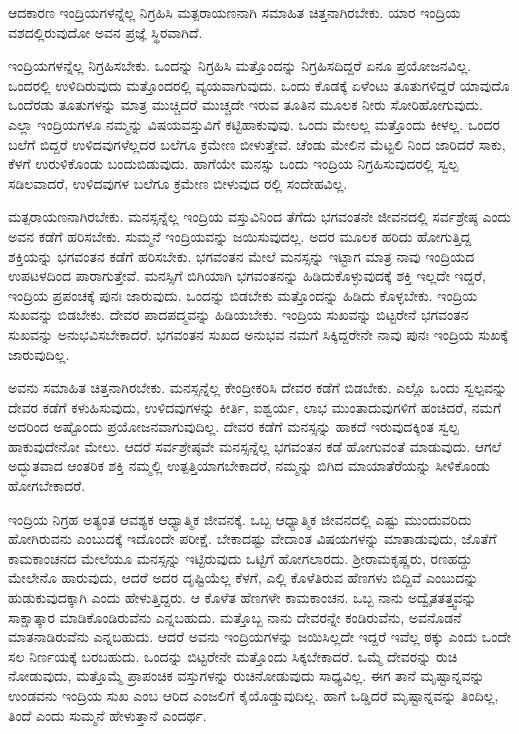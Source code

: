 {\small ಆದಕಾರಣ ಇಂದ್ರಿಯಗಳನ್ನೆಲ್ಲ ನಿಗ್ರಹಿಸಿ ಮತ್ಪರಾಯಣನಾಗಿ ಸಮಾಹಿತ ಚಿತ್ತನಾಗಿರಬೇಕು. ಯಾರ ಇಂದ್ರಿಯ ವಶದಲ್ಲಿರುವುದೋ ಅವನ ಪ್ರಜ್ಞೆ ಸ್ಥಿರವಾಗಿದೆ.}

ಇಂದ್ರಿಯಗಳನ್ನೆಲ್ಲ ನಿಗ್ರಹಿಸಬೇಕು. ಒಂದನ್ನು ನಿಗ್ರಹಿಸಿ ಮತ್ತೊಂದನ್ನು ನಿಗ್ರಹಿಸದಿದ್ದರೆ ಏನೂ ಪ್ರಯೋಜನವಿಲ್ಲ. ಒಂದರಲ್ಲಿ ಉಳಿದಿರುವುದು ಮತ್ತೊಂದರಲ್ಲಿ ವ್ಯಯವಾಗುವುದು. ಒಂದು ಕೊಡಕ್ಕೆ ಏಳೆಂಟು ತೂತುಗಳಿದ್ದರೆ ಯಾವುದೊ ಒಂದೆರಡು ತೂತುಗಳನ್ನು ಮಾತ್ರ ಮುಚ್ಚಿದರೆ ಮುಚ್ಚದೇ ಇರುವ ತೂತಿನ ಮೂಲಕ ನೀರು ಸೋರಿಹೋಗುವುದು. ಎಲ್ಲಾ ಇಂದ್ರಿಯಗಳೂ ನಮ್ಮನ್ನು ವಿಷಯವಸ್ತುವಿಗೆ ಕಟ್ಟಿಹಾಕುವುವು. ಒಂದು ಮೇಲಲ್ಲ ಮತ್ತೊಂದು ಕೀಳಲ್ಲ. ಒಂದರ ಬಲೆಗೆ ಬಿದ್ದರೆ ಉಳಿದವುಗಳೆಲ್ಲದರ ಬಲೆಗೂ ಕ್ರಮೇಣ ಬೀಳುತ್ತೇವೆ. ಚೆಂಡು ಮೇಲಿನ ಮೆಟ್ಟಲಿ ನಿಂದ ಜಾರಿದರೆ ಸಾಕು, ಕೆಳಗೆ ಉರುಳಿಕೊಂಡು ಬಂದುಬಿಡುವುದು. ಹಾಗೆಯೇ ಮನಸ್ಸು ಒಂದು ಇಂದ್ರಿಯ ನಿಗ್ರಹಿಸುವುದರಲ್ಲಿ ಸ್ವಲ್ಪ ಸಡಿಲವಾದರೆ, ಉಳಿದವುಗಳ ಬಲೆಗೂ ಕ್ರಮೇಣ ಬೀಳುವುದ ರಲ್ಲಿ ಸಂದೇಹವಿಲ್ಲ.

ಮತ್ಪರಾಯಣನಾಗಿರಬೇಕು. ಮನಸ್ಸನ್ನೆಲ್ಲ ಇಂದ್ರಿಯ ವಸ್ತುವಿನಿಂದ ತೆಗೆದು ಭಗವಂತನೇ ಜೀವನದಲ್ಲಿ ಸರ್ವಶ್ರೇಷ್ಠ ಎಂದು ಅವನ ಕಡೆಗೆ ಹರಿಸಬೇಕು. ಸುಮ್ಮನೆ ಇಂದ್ರಿಯವನ್ನು ಜಯಿಸುವುದಲ್ಲ. ಅದರ ಮೂಲಕ ಹರಿದು ಹೋಗುತ್ತಿದ್ದ ಶಕ್ತಿಯನ್ನು ಭಗವಂತನ ಕಡೆಗೆ ಹರಿಸಬೇಕು. ಭಗವಂತನ ಮೇಲೆ ಮನಸ್ಸನ್ನು ಇಟ್ಟಾಗ ಮಾತ್ರ ನಾವು ಇಂದ್ರಿಯದ ಉಪಟಳದಿಂದ ಪಾರಾಗುತ್ತೇವೆ. ಮನಸ್ಸಿಗೆ ಬಿಗಿಯಾಗಿ ಭಗವಂತನನ್ನು ಹಿಡಿದುಕೊಳ್ಳುವುದಕ್ಕೆ ಶಕ್ತಿ ಇಲ್ಲದೇ ಇದ್ದರೆ, ಇಂದ್ರಿಯ ಪ್ರಪಂಚಕ್ಕೆ ಪುನಃ ಜಾರುವುದು. ಒಂದನ್ನು ಬಿಡಬೇಕು ಮತ್ತೊಂದನ್ನು ಹಿಡಿದು ಕೊಳ್ಳಬೇಕು. ಇಂದ್ರಿಯ ಸುಖವನ್ನು ಬಿಡಬೇಕು. ದೇವರ ಪಾದಪದ್ಮವನ್ನು ಹಿಡಿಯಬೇಕು. ಇಂದ್ರಿಯ ಸುಖವನ್ನು ಬಿಟ್ಟರೇನೆ ಭಗವಂತನ ಸುಖವನ್ನು ಅನುಭವಿಸಬೇಕಾದರೆ. ಭಗವಂತನ ಸುಖದ ಅನುಭವ ನಮಗೆ ಸಿಕ್ಕಿದ್ದರೇನೇ ನಾವು ಪುನಃ ಇಂದ್ರಿಯ ಸುಖಕ್ಕೆ ಜಾರುವುದಿಲ್ಲ.

ಅವನು ಸಮಾಹಿತ ಚಿತ್ತನಾಗಿರಬೇಕು. ಮನಸ್ಸನ್ನೆಲ್ಲ ಕೇಂದ್ರೀಕರಿಸಿ ದೇವರ ಕಡೆಗೆ ಬಿಡಬೇಕು. ಎಲ್ಲೊ ಒಂದು ಸ್ವಲ್ಪವನ್ನು ದೇವರ ಕಡೆಗೆ ಕಳುಹಿಸುವುದು, ಉಳಿದವುಗಳನ್ನು ಕೀರ್ತಿ, ಐಶ್ವರ್ಯ, ಲಾಭ ಮುಂತಾದುವುಗಳಿಗೆ ಹಂಚಿದರೆ, ನಮಗೆ ಅದರಿಂದ ಅಷ್ಟೊಂದು ಪ್ರಯೋಜನವಾಗುವುದಿಲ್ಲ. ದೇವರ ಕಡೆಗೆ ಮನಸ್ಸನ್ನು ಹಾಕದೆ ಇರುವುದಕ್ಕಿಂತ ಸ್ವಲ್ಪ ಹಾಕುವುದೇನೋ ಮೇಲು. ಆದರೆ ಸರ್ವಶ್ರೇಷ್ಠವೇ ಮನಸ್ಸನ್ನೆಲ್ಲ ಭಗವಂತನ ಕಡೆ ಹೋಗುವಂತೆ ಮಾಡುವುದು. ಆಗಲೆ ಅದ್ಭುತವಾದ ಆಂತರಿಕ ಶಕ್ತಿ ನಮ್ಮಲ್ಲಿ ಉತ್ಪತ್ತಿಯಾಗಬೇಕಾದರೆ, ನಮ್ಮನ್ನು ಬಿಗಿದ ಮಾಯಾತೆರೆಯನ್ನು ಸೀಳಿಕೊಂಡು ಹೋಗಬೇಕಾದರೆ.

ಇಂದ್ರಿಯ ನಿಗ್ರಹ ಅತ್ಯಂತ ಆವಶ್ಯಕ ಆಧ್ಯಾತ್ಮಿಕ ಜೀವನಕ್ಕೆ. ಒಬ್ಬ ಆಧ್ಯಾತ್ಮಿಕ ಜೀವನದಲ್ಲಿ ಎಷ್ಟು ಮುಂದುವರಿದು ಹೋಗಿರುವನು ಎಂಬುದಕ್ಕೆ ಇದೊಂದೇ ಪರೀಕ್ಷೆ. ಬೇಕಾದಷ್ಟು ವೇದಾಂತ ವಿಷಯಗಳನ್ನು ಮಾತಾಡುವುದು, ಜೊತೆಗೆ ಕಾಮಕಾಂಚನದ ಮೇಲೆಯೂ ಮನಸ್ಸನ್ನು ಇಟ್ಟಿರುವುದು ಒಟ್ಟಿಗೆ ಹೋಗಲಾರದು. ಶ್ರೀರಾಮಕೃಷ್ಣರು, ರಣಹದ್ದು ಮೇಲೇನೊ ಹಾರುವುದು, ಆದರೆ ಅದರ ದೃಷ್ಟಿಯೆಲ್ಲ ಕೆಳಗೆ, ಎಲ್ಲಿ ಕೊಳೆತಿರುವ ಹೆಣಗಳು ಬಿದ್ದಿವೆ ಎಂಬುದನ್ನು ಹುಡುಕುವುದಕ್ಕಾಗಿ ಎಂದು ಹೇಳುತ್ತಿದ್ದರು. ಆ ಕೊಳೆತ ಹೆಣಗಳೇ ಕಾಮಕಾಂಚನ. ಒಬ್ಬ ನಾನು ಅದ್ವೈತತತ್ತ್ವವನ್ನು ಸಾಕ್ಷಾತ್ಕಾರ ಮಾಡಿಕೊಂಡಿರುವೆನು ಎನ್ನಬಹುದು. ಮತ್ತೊಬ್ಬ ನಾನು ದೇವರನ್ನೇ ಕಂಡಿರುವೆನು, ಅವನೊಡನೆ ಮಾತನಾಡಿರುವೆನು ಎನ್ನಬಹುದು. ಆದರೆ ಅವನು ಇಂದ್ರಿಯಗಳನ್ನು ಜಯಿಸಿಲ್ಲದೇ ಇದ್ದರೆ ಇವೆಲ್ಲ ಠಕ್ಕು ಎಂದು ಒಂದೇ ಸಲ ನಿರ್ಣಯಕ್ಕೆ ಬರಬಹುದು. ಒಂದನ್ನು ಬಿಟ್ಟರೇನೇ ಮತ್ತೊಂದು ಸಿಕ್ಕಬೇಕಾದರೆ. ಒಮ್ಮೆ ದೇವರನ್ನು ರುಚಿ ನೋಡುವುದು, ಮತ್ತೊಮ್ಮೆ ಪ್ರಾಪಂಚಿಕ ವಸ್ತುಗಳನ್ನು ರುಚಿನೋಡುವುದು ಸಾಧ್ಯವಿಲ್ಲ. ಈಗ ತಾನೆ ಮೃಷ್ಟಾನ್ನವನ್ನು ಉಂಡವನು ಇಂದ್ರಿಯ ಸುಖ ಎಂಬ ಆರಿದ ಎಂಜಲಿಗೆ ಕೈಯೊಡ್ಡುವುದಿಲ್ಲ. ಹಾಗೆ ಒಡ್ಡಿದರೆ ಮೃಷ್ಟಾನ್ನವನ್ನು ತಿಂದಿಲ್ಲ, ತಿಂದೆ ಎಂದು ಸುಮ್ಮನೆ ಹೇಳುತ್ತಾನೆ ಎಂದರ್ಥ.

